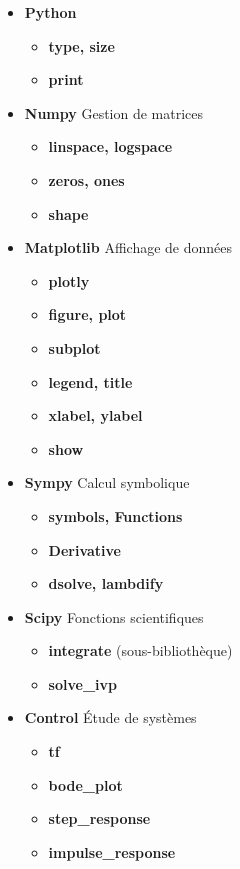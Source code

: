 
\begin{itemize}
	\item \textbf{Python}
	\begin{itemize}
		\item \textbf{type, size}
		\item \textbf{print}	
	\end{itemize}
	\item \textbf{Numpy} Gestion de matrices
	\begin{itemize}
		\item \textbf{linspace, logspace}
		\item \textbf{zeros, ones}
		\item \textbf{shape}	
	\end{itemize}
	\item \textbf{Matplotlib} Affichage de données
	\begin{itemize}
		\item \textbf{plotly} 
		\item \textbf{figure, plot}
		\item \textbf{subplot}
		\item \textbf{legend, title}	
		\item \textbf{xlabel, ylabel}	
		\item \textbf{show}	
	\end{itemize}
	\item \textbf{Sympy} Calcul symbolique
	\begin{itemize}
		\item \textbf{symbols, Functions}
		\item \textbf{Derivative}
		\item \textbf{dsolve, lambdify}	
	\end{itemize}	
	\item \textbf{Scipy} Fonctions scientifiques
	\begin{itemize}
		\item \textbf{integrate} (sous-bibliothèque)
		\item \textbf{solve\_ivp}
	\end{itemize}
	\item \textbf{Control} Étude de systèmes
	\begin{itemize}
		\item \textbf{tf}
		\item \textbf{bode\_plot}
		\item \textbf{step\_response}
		\item \textbf{impulse\_response}
	\end{itemize}
\end{itemize}